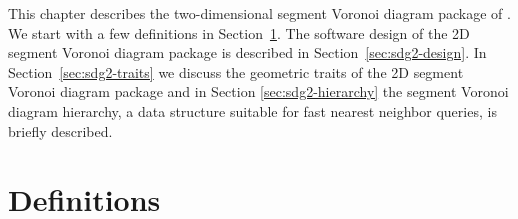 
This chapter describes the two-dimensional segment Voronoi diagram
package of \cgal. We start with a few definitions in 
Section~\ref{sec:sdg2-definitions}.
The software design of the 2D segment Voronoi diagram package is
described in Section~\ref{sec:sdg2-design}.
In Section~\ref{sec:sdg2-traits} we discuss the geometric
traits of the 2D segment Voronoi diagram package and in Section
\ref{sec:sdg2-hierarchy} the segment Voronoi diagram hierarchy, a
data structure suitable for fast nearest neighbor queries, is briefly
described.


\section{Definitions}
\label{sec:sdg2-definitions}

